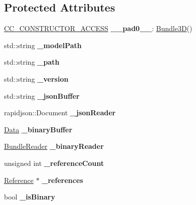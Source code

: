 \subsection*{Protected Attributes}
\begin{DoxyCompactItemize}
\item 
\mbox{\label{classBundle3D_a00aa255ac5ce913f0ce86dc9178c01f4}} 
\hyperlink{_2cocos2d_2cocos_2base_2ccConfig_8h_a25ef1314f97c35a2ed3d029b0ead6da0}{C\+C\+\_\+\+C\+O\+N\+S\+T\+R\+U\+C\+T\+O\+R\+\_\+\+A\+C\+C\+E\+SS} {\bfseries \+\_\+\+\_\+pad0\+\_\+\+\_\+}\+: \hyperlink{classBundle3D}{Bundle3D}()
\item 
\mbox{\label{classBundle3D_afb55e34887bbb94257dceaf5c4e8bfcc}} 
std\+::string {\bfseries \+\_\+model\+Path}
\item 
\mbox{\label{classBundle3D_a248052200efc05d37f0efa277cc7b80d}} 
std\+::string {\bfseries \+\_\+path}
\item 
\mbox{\label{classBundle3D_a70aaf4a06df9fea4d0585720b75451ef}} 
std\+::string {\bfseries \+\_\+version}
\item 
\mbox{\label{classBundle3D_affc2034e3bbf51bb9034d9deb5c97b65}} 
std\+::string {\bfseries \+\_\+json\+Buffer}
\item 
\mbox{\label{classBundle3D_a56c0607a73d14a87e19ac1a413173789}} 
rapidjson\+::\+Document {\bfseries \+\_\+json\+Reader}
\item 
\mbox{\label{classBundle3D_a9fae743d38264da011e44167427ad608}} 
\hyperlink{classData}{Data} {\bfseries \+\_\+binary\+Buffer}
\item 
\mbox{\label{classBundle3D_a8579d16eefc094c2e48bc4982871404a}} 
\hyperlink{classBundleReader}{Bundle\+Reader} {\bfseries \+\_\+binary\+Reader}
\item 
\mbox{\label{classBundle3D_a26f28b6608c5c174f8ab9fcc84f1e6bd}} 
unsigned int {\bfseries \+\_\+reference\+Count}
\item 
\mbox{\label{classBundle3D_a557afdac44542824a9479b3668e53033}} 
\hyperlink{structReference}{Reference} $\ast$ {\bfseries \+\_\+references}
\item 
\mbox{\label{classBundle3D_a8dbd8c1f8f5fe0a00a7d2890adce73cb}} 
bool {\bfseries \+\_\+is\+Binary}
\end{DoxyCompactItemize}


